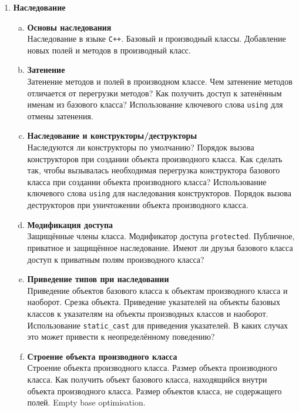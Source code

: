 \documentclass{article}
\begin{document}
\begin{enumerate}
\item \textbf{Наследование}
\begin{enumerate}[a.]
\item \textbf{Основы наследования}\\
Наследование в языке \texttt{C++}. Базовый и производный классы. Добавление новых полей и методов в производный класс. 

\item \textbf{Затенение}\\
Затенение методов и полей в производном классе. Чем затенение методов отличается от перегрузки методов? Как получить доступ к затенённым именам из базового класса? Использование ключевого слова \texttt{using} для отмены затенения.

\item \textbf{Наследование и конструкторы/деструкторы}\\
Наследуются ли конструкторы по умолчанию? Порядок вызова конструкторов при создании объекта производного класса. Как сделать так, чтобы вызывалась необходимая перегрузка конструктора базового класса при создании объекта производного класса? Использование ключевого слова \texttt{using} для наследования конструкторов. Порядок вызова деструкторов при уничтожении объекта производного класса.

\item \textbf{Модификация доступа}\\
Защищённые члены класса. Модификатор доступа \texttt{protected}. Публичное, приватное и защищённое наследование. Имеют ли друзья базового класса доступ к приватным полям производного класса?

\item \textbf{Приведение типов при наследовании}\\
Приведение объектов базового класса к объектам производного класса и наоборот. Срезка объекта. Приведение указателей на объекты базовых классов к указателям на объекты производных классов и наоборот. Использование \texttt{static\_cast} для приведения указателей. В каких случах это может привести к неопределённому поведению?

\item \textbf{Строение объекта производного класса}\\
Строение объекта производного класса. Размер объекта производного класса. Как получить объект базового класса, находящийся внутри объекта производного класса. Размер объектов класса, не содержащего полей. Empty base optimisation.


\end{enumerate}
\end{enumerate}
\end{document}
